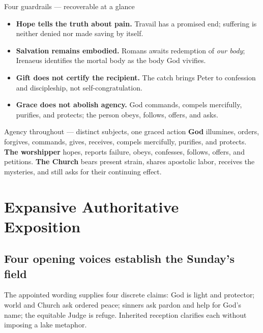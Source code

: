 \begin{deepstudy}
\begin{studybox}{Four guardrails --- recoverable at a glance}
\begin{itemize}[topsep=0pt,itemsep=0.25em,parsep=0pt]
\item \textbf{Hope tells the truth about pain.} Travail has a promised end; suffering is neither denied nor made saving by itself.
\item \textbf{Salvation remains embodied.} Romans awaits redemption of \emph{our body}; Irenaeus identifies the mortal body as the body God vivifies.
\item \textbf{Gift does not certify the recipient.} The catch brings Peter to confession and discipleship, not self-congratulation.
\item \textbf{Grace does not abolish agency.} God commands, compels mercifully, purifies, and protects; the person obeys, follows, offers, and asks.
\end{itemize}
\end{studybox}

\begin{massbox}{Agency throughout --- distinct subjects, one graced action}
\textbf{God} illumines, orders, forgives, commands, gives, receives, compels mercifully, purifies, and protects. \textbf{The worshipper} hopes, reports failure, obeys, confesses, follows, offers, and petitions. \textbf{The Church} bears present strain, shares apostolic labor, receives the mysteries, and still asks for their continuing effect.
\end{massbox}

\newpage
\section*{Expansive Authoritative Exposition}

\subsection*{Four opening voices establish the Sunday's field\enspace{}}

The appointed wording supplies four discrete claims: God is light and protector; world and Church ask ordered peace; sinners ask pardon and help for God's name; the equitable Judge is refuge. Inherited reception clarifies each without imposing a lake metaphor.


\end{deepstudy}
